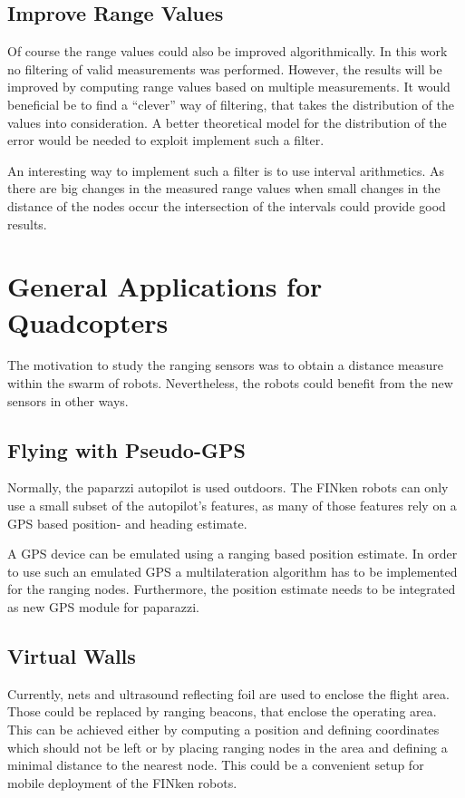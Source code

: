 \subsection{Improve Range Values}

Of course the range values could also be improved algorithmically.
In this work no filtering of valid measurements was performed.
However, the results will be improved by computing range values based on multiple measurements.
It would beneficial be to find a “clever” way of filtering, that takes the distribution of the values into consideration.
A better theoretical model for the distribution of the error would be needed to exploit implement such a filter.

An interesting way to implement such a filter is to use interval arithmetics.
As there are big changes in the measured range values when small changes in the distance of the nodes occur the intersection of the intervals could provide good results.

\section{General Applications for Quadcopters}

The motivation to study the ranging sensors was to obtain a distance measure within the swarm of robots.
Nevertheless, the robots could benefit from the new sensors in other ways.

\subsection{Flying with Pseudo-GPS}
Normally, the paparzzi autopilot is used outdoors.
The FINken robots can only use a small subset of the autopilot's features, as many of those features rely on a GPS based position- and heading estimate.

A GPS device can be emulated using a ranging based position estimate.
In order to use such an emulated GPS a multilateration algorithm has to be implemented for the ranging nodes.
Furthermore, the position estimate needs to be integrated as new GPS module for paparazzi.


\subsection{Virtual Walls}
\label{boundingbox}
Currently, nets and ultrasound reflecting foil are used to enclose the flight area.
Those could be replaced by ranging beacons, that enclose the operating area.
This can be achieved either by computing a position and defining coordinates which should not be left or by placing ranging nodes in the area and defining a minimal distance to the nearest node.
This could be a convenient setup for mobile deployment of the FINken robots.


